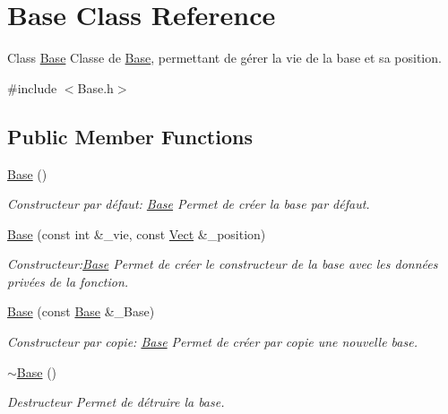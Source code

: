 \hypertarget{classBase}{}\section{Base Class Reference}
\label{classBase}


Class \hyperlink{classBase}{Base} Classe de \hyperlink{classBase}{Base}, permettant de gérer la vie de la base et sa position.  




{\ttfamily \#include $<$Base.\+h$>$}

\subsection*{Public Member Functions}
\begin{DoxyCompactItemize}
\item 
\hyperlink{classBase_a5ffe0568374d8b9b4c4ec32953fd6453}{Base} ()
\begin{DoxyCompactList}\small\item\em Constructeur par défaut\+: \hyperlink{classBase}{Base} Permet de créer la base par défaut. \end{DoxyCompactList}\item 
\hyperlink{classBase_aa56feb99f89924004cbb864cce83ccc0}{Base} (const int \&\+\_\+vie, const \hyperlink{classVect}{Vect} \&\+\_\+position)
\begin{DoxyCompactList}\small\item\em Constructeur\+:\hyperlink{classBase}{Base} Permet de créer le constructeur de la base avec les données privées de la fonction. \end{DoxyCompactList}\item 
\hyperlink{classBase_a8520b7acb2f08e4c892a7ea3213539a7}{Base} (const \hyperlink{classBase}{Base} \&\+\_\+\+Base)
\begin{DoxyCompactList}\small\item\em Constructeur par copie\+: \hyperlink{classBase}{Base} Permet de créer par copie une nouvelle base. \end{DoxyCompactList}\item 
\mbox{\label{classBase_a722da881b6c70cfcbde9243abcfbf334}} 
\hyperlink{classBase_a722da881b6c70cfcbde9243abcfbf334}{$\sim$\+Base} ()
\begin{DoxyCompactList}\small\item\em Destructeur Permet de détruire la base. \end{DoxyCompactList}\item 

\end{DoxyCompactItemize}
